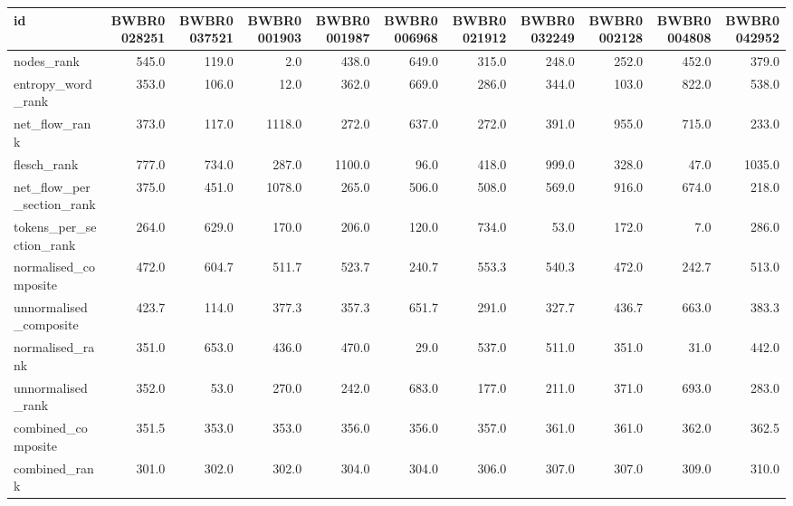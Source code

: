 \begin{tabular}{lrrrrrrrrrr}
\toprule
id & BWBR0028251 & BWBR0037521 & BWBR0001903 & BWBR0001987 & BWBR0006968 & BWBR0021912 & BWBR0032249 & BWBR0002128 & BWBR0004808 & BWBR0042952 \\
\midrule
nodes\_rank & 545.0 & 119.0 & 2.0 & 438.0 & 649.0 & 315.0 & 248.0 & 252.0 & 452.0 & 379.0 \\
\cline{1-11}
entropy\_word\_rank & 353.0 & 106.0 & 12.0 & 362.0 & 669.0 & 286.0 & 344.0 & 103.0 & 822.0 & 538.0 \\
\cline{1-11}
net\_flow\_rank & 373.0 & 117.0 & 1118.0 & 272.0 & 637.0 & 272.0 & 391.0 & 955.0 & 715.0 & 233.0 \\
\cline{1-11}
flesch\_rank & 777.0 & 734.0 & 287.0 & 1100.0 & 96.0 & 418.0 & 999.0 & 328.0 & 47.0 & 1035.0 \\
\cline{1-11}
net\_flow\_per\_section\_rank & 375.0 & 451.0 & 1078.0 & 265.0 & 506.0 & 508.0 & 569.0 & 916.0 & 674.0 & 218.0 \\
\cline{1-11}
tokens\_per\_section\_rank & 264.0 & 629.0 & 170.0 & 206.0 & 120.0 & 734.0 & 53.0 & 172.0 & 7.0 & 286.0 \\
\cline{1-11}
normalised\_composite & 472.0 & 604.7 & 511.7 & 523.7 & 240.7 & 553.3 & 540.3 & 472.0 & 242.7 & 513.0 \\
\cline{1-11}
unnormalised\_composite & 423.7 & 114.0 & 377.3 & 357.3 & 651.7 & 291.0 & 327.7 & 436.7 & 663.0 & 383.3 \\
\cline{1-11}
normalised\_rank & 351.0 & 653.0 & 436.0 & 470.0 & 29.0 & 537.0 & 511.0 & 351.0 & 31.0 & 442.0 \\
\cline{1-11}
unnormalised\_rank & 352.0 & 53.0 & 270.0 & 242.0 & 683.0 & 177.0 & 211.0 & 371.0 & 693.0 & 283.0 \\
\cline{1-11}
combined\_composite & 351.5 & 353.0 & 353.0 & 356.0 & 356.0 & 357.0 & 361.0 & 361.0 & 362.0 & 362.5 \\
\cline{1-11}
combined\_rank & 301.0 & 302.0 & 302.0 & 304.0 & 304.0 & 306.0 & 307.0 & 307.0 & 309.0 & 310.0 \\
\cline{1-11}
\bottomrule
\end{tabular}
